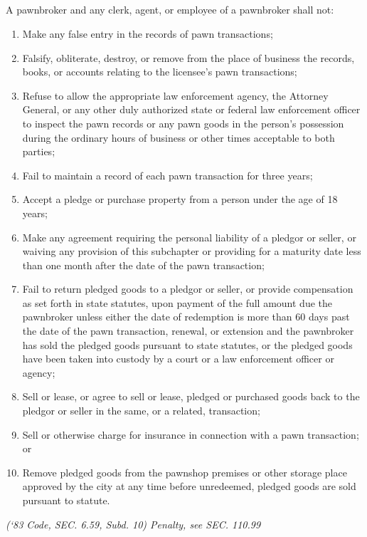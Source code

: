 \subsection{}
A pawnbroker and any clerk, agent, or employee of a pawnbroker shall not:
\begin{enumerate}[{\indent}1)]
    \item Make any false entry in the records of pawn transactions;
    \item Falsify, obliterate, destroy, or remove from the place of business the records, books, or accounts relating to the licensee’s pawn transactions;
    \item Refuse to allow the appropriate law enforcement agency, the Attorney General, or any other duly authorized state or federal law enforcement officer to inspect the pawn records or any pawn goods in the person’s possession during the ordinary hours of business or other times acceptable to both parties;
    \item Fail to maintain a record of each pawn transaction for three years;
    \item Accept a pledge or purchase property from a person under the age of 18 years;
    \item Make any agreement requiring the personal liability of a pledgor or seller, or waiving any provision of this subchapter or providing for a maturity date less than one month after the date of the pawn transaction;
    \item Fail to return pledged goods to a pledgor or seller, or provide compensation as set forth in state statutes, upon payment of the full amount due the pawnbroker unless either the date of redemption is more than 60 days past the date of the pawn transaction, renewal, or extension and the pawnbroker has sold the pledged goods pursuant to state statutes, or the pledged goods have been taken into custody by a court or a law enforcement officer or agency;
    \item Sell or lease, or agree to sell or lease, pledged or purchased goods back to the pledgor or seller in the same, or a related, transaction;
    \item Sell or otherwise charge for insurance in connection with a pawn transaction; or
    \item Remove pledged goods from the pawnshop premises or other storage place approved by the city at any time before unredeemed, pledged goods are sold pursuant to statute.
\end{enumerate}
\emph{(‘83 Code, SEC. 6.59, Subd. 10)  Penalty, see SEC. 110.99}
